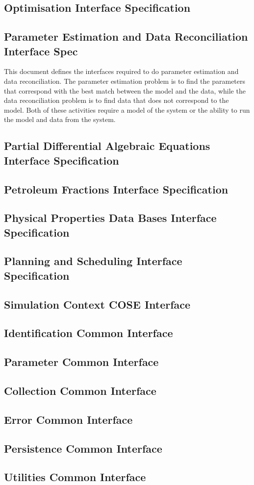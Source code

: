 \subsection{Optimisation Interface Specification}

\subsection{Parameter Estimation and Data Reconciliation Interface Spec}
This document defines the interfaces required to do parameter estimation and data reconciliation.  The parameter estimation problem is to find the parameters that correspond with the best match between the model and the data, while the data reconciliation problem is to find data that does not correspond to the model.  Both of these activities require a model of the system or the ability to run the model and data from the system.  

\subsection{Partial Differential Algebraic Equations Interface Specification}

\subsection{Petroleum Fractions Interface Specification}

\subsection{Physical Properties Data Bases Interface Specification}

\subsection{Planning and Scheduling Interface Specification}

\subsection{Simulation Context COSE Interface}


\subsection{Identification Common Interface}
\subsection{Parameter Common Interface}
\subsection{Collection Common Interface}
\subsection{Error Common Interface}
\subsection{Persistence Common Interface}
\subsection{Utilities Common Interface}


